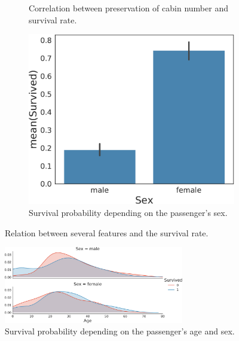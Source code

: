\begin{figure}
\begin{subfigure}[b]{0.3\textwidth}
     \caption{Correlation between preservation of cabin number and survival rate.}
     \label{fig:cabinfeat}
    \end{subfigure}
    \quad
    \begin{subfigure}[b]{0.3\textwidth}
        \includegraphics[width=\textwidth]{media_saved/sex_survived}
  \caption{Survival probability depending on the passenger's sex.\\}
  \label{fig:sexfeat}
    \end{subfigure}
    \caption{Relation between several features and the survival rate.}
\end{figure}


\begin{figure}
\includegraphics[width=0.7\textwidth]{media_saved/age_sex}
 \centering

     \caption{Survival probability depending on the passenger's age and sex.}
     \label{fig:ageallfeat}
 \end{figure}
 
